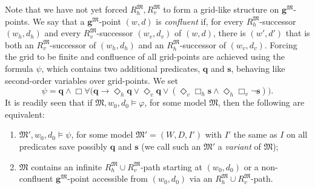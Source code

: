 \documentclass{lmcs} %
\theoremstyle{plain}\newtheorem{satz}[thm]{Satz} %
\newcommand{\nz}[1]{\textcolor{blue}{\bf!}%
	\marginpar[\parbox{15mm}{\raggedleft\scriptsize\textcolor{blue}{#1}}]%
	{\parbox{15mm}{\raggedright\scriptsize\textcolor{blue}{#1}}}}
\newcommand{\Dht}[1]{\Diamond_h{#1}}
\newcommand{\Dvt}[1]{\Diamond_v{#1}}
\newcommand{\Bht}[1]{\Box_h{#1}}
\newcommand{\Bvt}[1]{\Box_v{#1}}
\newcommand{\ssvar}{\fform{s}}
\newcommand{\fform}[1]{\boldsymbol{#1}}
\newcommand{\qvar}{\fform{q}}
\newcommand{\gvar}{\fform{g}}
\newcommand{\ovar}{\fform{o}}
\newcommand{\Bv}{\forall}
\newcommand{\Bh}{\Box}
\begin{document}
Note that we have not yet forced $R_{h}^\mathfrak M,R_{v}^\mathfrak M$ to form a grid-like structure on $\gvar^\mathfrak M$-points. We say that a $\gvar^\mathfrak M$-point $(w,d)$ is \emph{confluent} if,  
for every $R_h^\mathfrak M$-successor $(w_h,d_h)$ and every $R_v^\mathfrak M$-successor $(w_v,d_v)$ 
of $(w,d)$, there is $(w',d')$ that is both an $R_v^\mathfrak M$-successor of $(w_h,d_h)$ and an
$R_h^\mathfrak M$-successor of $(w_v,d_v)$. 
Forcing the grid to be finite and confluence of all grid-points are
achieved using the formula $\psi$, which contains two additional predicates, $\qvar$ and $\ssvar$, behaving like second-order variables over grid-points. We set
%
$$
\psi = \qvar\land\Bh\Bv\bigl(\qvar\to 
\Dht{\qvar}\lor\Dvt\qvar\lor(\Dvt{\Bht{\ssvar}}\land\Dht{\Bvt{\neg\ssvar}})\bigr).
$$
%
%
It is readily seen that if $\mathfrak{M},w_0,d_0\models \varphi$, for some model $\mathfrak M$, then the following are equivalent: 
%
\begin{enumerate}[style=multiline,leftmargin=0.9cm]
	\item[\textbf{(c1)}] $\mathfrak{M}',w_0,d_0\models \psi$, for some model $\mathfrak M' = (W,D,I')$ with $I'$ the same as $I$ on all predicates save possibly $\qvar$ and $\ssvar$ (we call such an $\mathfrak M'$ a \emph{variant} of $\mathfrak M$);
	
	\item[\textbf{(c2)}] $\mathfrak M$ contains an infinite $R_{h}^\mathfrak M\cup R_{v}^\mathfrak M$-path starting at $(w_0,d_0)$ or a non-confluent $\gvar^\mathfrak M$-point accessible from $(w_0,d_0)$ via an $R_{h}^\mathfrak M\cup R_{v}^\mathfrak M$-path.
\end{enumerate}

\end{document}
